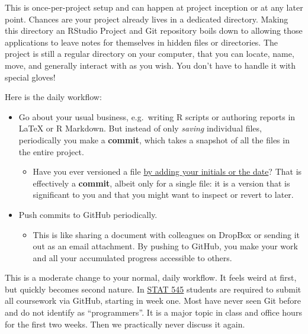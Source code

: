 \documentclass[12pt]{article}
\providecommand{\tightlist}{%
  \setlength{\itemsep}{0pt}\setlength{\parskip}{0pt}}
\begin{document}
This is once-per-project setup and can happen at project inception or at
any later point. Chances are your project already lives in a dedicated
directory. Making this directory an RStudio Project and Git repository
boils down to allowing those applications to leave notes for themselves
in hidden files or directories. The project is still a regular directory
on your computer, that you can locate, name, move, and generally
interact with as you wish. You don't have to handle it with special
gloves!

Here is the daily workflow:

\begin{itemize}
\tightlist
\item
  Go about your usual business, e.g.~writing R scripts or authoring
  reports in LaTeX or R Markdown. But instead of only \emph{saving}
  individual files, periodically you make a \textbf{commit}, which takes
  a snapshot of all the files in the entire project.

  \begin{itemize}
  \tightlist
  \item
    Have you ever versioned a file
    \href{http://www.phdcomics.com/comics/archive.php?comicid=1531}{by
    adding your initials or the date}? That is effectively a
    \textbf{commit}, albeit only for a single file: it is a version that
    is significant to you and that you might want to inspect or revert
    to later.
  \end{itemize}
\item
  Push commits to GitHub periodically.

  \begin{itemize}
  \tightlist
  \item
    This is like sharing a document with colleagues on DropBox or
    sending it out as an email attachment. By pushing to GitHub, you
    make your work and all your accumulated progress accessible to
    others.
  \end{itemize}
\end{itemize}

This is a moderate change to your normal, daily workflow. It feels weird
at first, but quickly becomes second nature. In
\href{http://stat545.com}{STAT 545} students are required to submit all
coursework via GitHub, starting in week one. Most have never seen Git
before and do not identify as ``programmers''. It is a major topic in
class and office hours for the first two weeks. Then we practically
never discuss it again.
\end{document}
